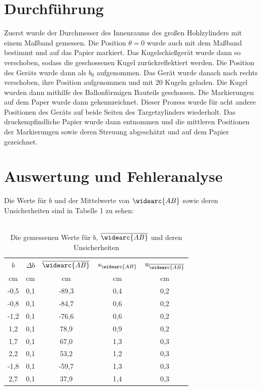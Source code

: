 \documentclass[11pt,a4paper]{article}
\begin{document}
\section{Durchführung}
Zuerst wurde der Durchmesser des Innenraums des großen Hohlzylinders mit einem Maßband gemessen. Die Position $\theta = 0$ wurde auch mit dem Maßband bestimmt und auf das Papier markiert. Das Kugelschießgerät wurde dann so verschoben, sodass die geschossenen Kugel zurückreflektiert werden. Die Position des Geräts wurde dann als $b_0$ aufgenommen. Das Gerät wurde danach nach rechts verschoben, ihre Position aufgenommen und mit 20 Kugeln geladen. Die Kugel wurden dann mithilfe des Ballonförmigen Bauteils geschossen. Die Markierungen auf dem Paper wurde dann gekennzeichnet. Dieser Prozess wurde für acht andere Positionen des Geräts auf beide Seiten des Targetzylinders wiederholt. Das druckempfindliche Papier wurde dann entnommen und die mittleren Positionen der Markierungen sowie deren Streuung abgeschätzt und auf dem Papier gezeichnet. 


\section{Auswertung und Fehleranalyse}

Die Werte für $b$ und der Mittelwerte von $\widearc{AB}$ sowie deren Unsicherheiten sind in Tabelle 1 zu sehen:
\\\
\begin{table}[h]
	\centering
	\begin{tabular*}{0.50\textwidth}{@{\extracolsep{\fill}}ccccc}
		\toprule
		$b$ & $\Delta b$ & $\overline{\widearc{AB}}$ & $s_{\widearc{AB}}$ & $u_{\overline{\widearc{AB}}}$ \\
		cm & cm & cm &cm& cm\\
		\midrule
		-0,5 & 0,1 & -89,3 & 0,4 & 0,2\\
		-0,8 & 0,1 & -84,7 &0,6& 0,2\\
		-1,2 & 0,1 & -76,6 &0,6& 0,2\\
		1,2 & 0,1& 78,9 &0,9& 0,2 \\
		1,7 & 0,1 & 67,0 &1,3& 0,3 \\
		2,2 & 0,1 & 53,2 &1,2& 0,3 \\
		-1,8 & 0,1 & -59,7 &1,3& 0,3 \\
		2,7 & 0,1 & 37,9 &1,4& 0,3\\
		\bottomrule
\end{tabular*}
\caption{Die gemessenen Werte für $b$, $\overline{\widearc{AB}}$ und deren Unsicherheiten}
\end{table}
\end{document}
